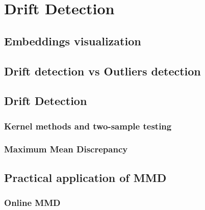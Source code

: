 \section{Drift Detection}
\subsection{Embeddings visualization}
\subsection{Drift detection vs Outliers detection}

\subsection{Drift Detection}
\subsubsection{Kernel methods and two-sample testing}
\subsubsection{Maximum Mean Discrepancy}
\subsection{Practical application of MMD}
\subsubsection{Online MMD}